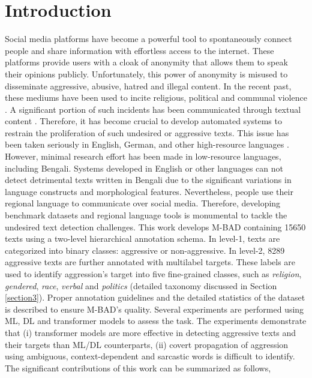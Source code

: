 \documentclass[11pt]{article}
\begin{document}
\section{Introduction}
Social media platforms have become a powerful tool to spontaneously connect people and share information with effortless access to the internet. These platforms provide users with a cloak of anonymity that allows them to speak their opinions publicly. Unfortunately, this power of anonymity is misused to disseminate aggressive, abusive, hatred and illegal content. In the recent past, these mediums have been used to incite religious, political and communal violence \cite{hartung-etal-2017-ranking}. A significant portion of such incidents has been communicated through textual content \cite{trac-2020-trolling,nlp4if-2021-nlp}. Therefore, it has become crucial to develop automated systems to restrain the proliferation of such undesired or aggressive texts. This issue has been taken seriously in English, German, and other high-resource languages \cite{caselli-etal-2021-hatebert,aksenov-etal-2021-fine}. However, minimal research effort has been made in low-resource languages, including Bengali. Systems developed in English or other languages can not detect detrimental texts written in Bengali due to the significant variations in language constructs and morphological features. Nevertheless, people use their regional language to communicate over social media. Therefore, developing benchmark datasets and regional language tools is monumental to tackle the undesired text detection challenges. This work develops  M-BAD containing 15650 texts using a two-level hierarchical annotation schema. In level-1, texts are categorized into binary classes: aggressive or non-aggressive. In level-2, 8289 aggressive texts are further annotated with multilabel targets. These labels are used to identify aggression's target into five fine-grained classes, such as \textit{religion}, \textit{gendered}, \textit{race}, \textit{verbal} and \textit{politics} (detailed taxonomy discussed in Section \ref{section3}). Proper annotation guidelines and the detailed statistics of the dataset is described to ensure M-BAD's quality. Several experiments are performed using ML, DL and transformer models to assess the task. The experiments demonstrate that (i) transformer models are more effective in detecting aggressive texts and their targets than ML/DL counterparts, (ii) covert propagation of aggression using ambiguous, context-dependent and sarcastic words is difficult to identify. The significant contributions of this work can be summarized as follows,
\end{document}
